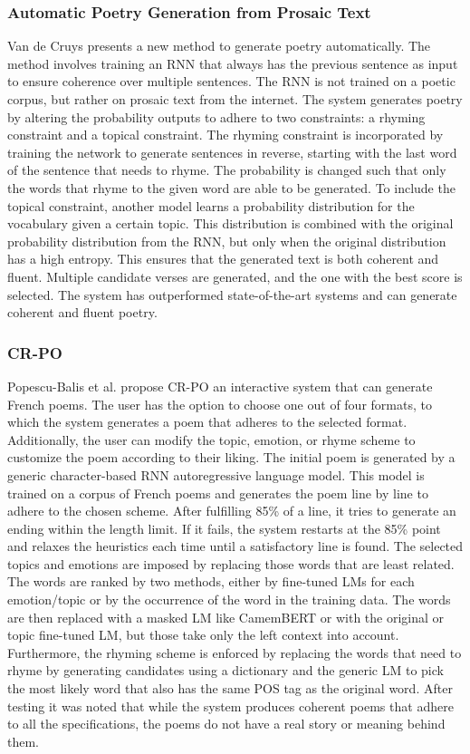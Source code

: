 \subsubsection{Automatic Poetry Generation from Prosaic Text}
Van de Cruys \cite{van-de-cruys-2020-automatic} presents a new method to 
generate poetry automatically. The method involves training an RNN that always has the previous sentence as input to ensure coherence over multiple sentences. The RNN is not trained on a poetic corpus, but rather on prosaic text from the internet. The system generates poetry by altering the probability outputs to adhere to two constraints: a rhyming constraint and a topical constraint. The rhyming constraint is incorporated by training the network to generate sentences in reverse, starting with the last word of the sentence that needs to rhyme. The probability is changed such that only the words that rhyme to the given word are able to be generated. To include the topical constraint, another model learns a probability distribution for the vocabulary given a certain topic. This distribution is combined with the original probability distribution from the RNN, but only when the original distribution has a high entropy. This ensures that the generated text is both coherent and fluent. Multiple candidate verses are generated, and the one with the best score is selected. The system has outperformed state-of-the-art systems and can generate coherent and fluent poetry.

\subsubsection{CR-PO}
Popescu-Balis et al. propose CR-PO \cite{popescu-belis-etal-2022-constrained} an interactive system that can generate French poems. The user has the option to choose one out of four formats, to which the system generates a poem that adheres to the selected format. Additionally, the user can modify the topic, emotion, or rhyme scheme to customize the poem according to their liking. The initial poem is generated by a generic character-based RNN autoregressive language model. This model is trained on a corpus of French poems and generates the poem line by line to adhere to the chosen scheme. After fulfilling 85\% of a line, it tries to generate an ending within the length limit. If it fails, the system restarts at the 85\% point and relaxes the heuristics each time until a satisfactory line is found. The selected topics and emotions are imposed by replacing those words that are least related. The words are ranked by two methods, either by fine-tuned LMs for each emotion/topic or by the occurrence of the word in the training data. The words are then replaced with a masked LM like CamemBERT or with the original or topic fine-tuned LM, but those take only the left context into account. Furthermore, the rhyming scheme is enforced by replacing the words that need to rhyme by generating candidates using a dictionary and the generic LM to pick the most likely word that also has the same POS tag as the original word. After testing it was noted that while the system produces coherent poems that adhere to all the specifications, the poems do not have a real story or meaning behind them.



